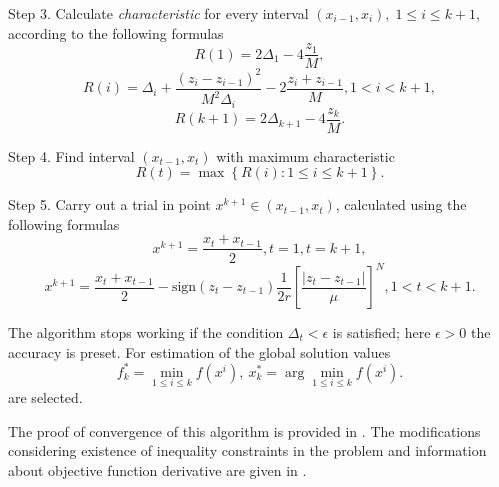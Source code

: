 \documentclass[smallcondensed]{svjour3}     %
\begin{document}
Step 3. Calculate \textit{characteristic} for every interval $(x_{i-1}, x_i), \; 1\leq i \leq k+1,$   according to the following formulas
\[
R(1)=2\Delta_1-4\frac{z_1}{M},
\]
\begin{equation}\label{eq:14}
R(i)=\Delta_i+\frac{(z_i-z_{i-1})^2}{M^2\Delta_i}-2\frac{z_i+z_{i-1}}{M},1<i<k+1,
\end{equation}
\[
R(k+1)=2\Delta_{k+1}-4\frac{z_k}{M}.
\]

Step 4. Find interval $(x_{t-1},x_t)$ with maximum characteristic
\[
R(t)=\max{\left\{R(i): 1 \leq i \leq k+1\right\}}.
\]

Step 5. Carry out a trial in point $x^{k+1}\in(x_{t-1},x_t)$, calculated using the following formulas
\[
x^{k+1} = \frac{x_t+x_{t-1}}{2}, t=1, t=k+1,
\]
\[
x^{k+1} = \frac{x_t+x_{t-1}}{2} - \mathrm{sign}(z_t-z_{t-1})\frac{1}{2r}\left[\frac{\left|z_t-z_{t-1}\right|}{\mu}\right]^N, 1<t<k+1.
\]

The algorithm stops working if the condition $\Delta_t<\epsilon$ is satisfied; here $\epsilon>0$ the accuracy is preset. For estimation of the global solution values
\[
f_k^\ast=\min_{1\leq i \leq k}f(x^i), \ x_k^\ast=\arg \min_{1\leq i \leq k}f(x^i).
\]
are selected.

The proof of convergence of this algorithm is provided in \cite{RefStrongin2000}. The modifications considering existence of inequality constraints in the problem and information about objective function derivative are given in \cite{RefBarkalov,RefGergel1996,RefGergel1997}.
\end{document}
